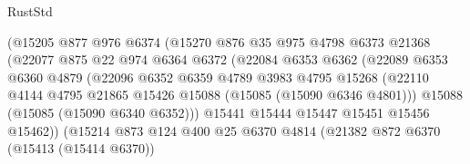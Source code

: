 \begin{lexlean}{RustStd}
\begin{coremodule}
                              (@15205
                                @877
                                @976
                                @6374
                                (@15270
                                  @876
                                  @35
                                  @975
                                  @4798
                                  @6373
                                  @21368
                                  (@22077
                                    @875
                                    @22
                                    @974
                                    @6364
                                    @6372
                                    (@22084
                                      @6353
                                      @6362
                                      (@22089
                                        @6353
                                        @6360
                                        @4879
                                        (@22096
                                          @6352
                                          @6359
                                          @4789
                                          @3983
                                          @4795
                                          @15268
                                          (@22110
                                            @4144
                                            @4795
                                            @21865
                                            @15426
                                            @15088
                                            (@15085 (@15090 @6346 @4801)))
                                          @15088
                                          (@15085 (@15090 @6340 @6352)))
                                        @15441
                                        @15444
                                        @15447
                                        @15451
                                        @15456
                                        @15462))
                                    (@15214
                                      @873
                                      @124
                                      @400
                                      @25
                                      @6370
                                      @4814
                                      (@21382
                                        @872
                                        @6370
                                        (@15413 (@15414 @6370))

\end{coremodule}
\end{lexlean}
